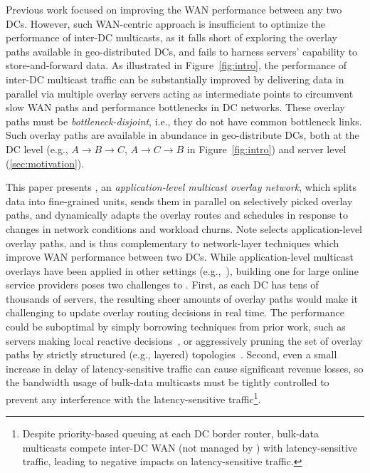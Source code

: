 Previous work focused on improving the WAN performance between any 
two DCs. 
However, such WAN-centric approach is insufficient to optimize the 
performance of inter-DC multicasts, as it falls short of exploring 
the overlay paths available in geo-distributed DCs, and 
fails to harness servers' capability to store-and-forward data.
As illustrated in Figure~\ref{fig:intro}, the performance of 
inter-DC multicast traffic can be substantially improved by 
delivering data in parallel via multiple overlay  servers 
acting as intermediate points to circumvent slow WAN paths and 
performance bottlenecks in DC networks. 
These overlay paths must be {\em bottleneck-disjoint}, i.e., they do 
not have common bottleneck links. 
Such overlay paths are available in abundance in 
geo-distribute DCs, both at the 
DC level (e.g., $A$$\rightarrow$$B$$\rightarrow$$C$, 
$A$$\rightarrow$$C$$\rightarrow$$B$ in Figure~\ref{fig:intro}) 
and server level (\Section\ref{sec:motivation}).




This paper presents {\em \name}, an {\em application-level 
multicast overlay network}, which 
\name splits data into fine-grained 
units, sends them in parallel on selectively picked 
overlay paths, and dynamically adapts the overlay routes and 
schedules in response to changes in network conditions and 
workload churns.
Note \name selects application-level overlay paths, and is thus
complementary to network-layer techniques which
improve WAN performance between two DCs.
While application-level multicast overlays have been applied 
in other settings
(e.g.,~\cite{Liebeherr2002Application,Wang2007mTreebone,
Andreev2013Designing,Mokhtarian2015Minimum}), building one
for large online service providers poses two 
challenges to \name.
First, as each DC has tens of thousands of servers, the 
resulting sheer amounts of overlay paths would make it 
challenging to update overlay routing decisions in real time. 
The performance could be suboptimal by simply borrowing techniques 
from prior work, such as servers making local reactive
decisions~\cite{kostic2003bullet,Repantis2010Scaling,VdnAtSIGCOMM2014},
or aggressively pruning the set of overlay paths by strictly 
structured (e.g., layered) topologies~\cite{Nygren2010The}.
Second, even a small increase in delay of latency-sensitive traffic 
can cause significant revenue losses, so the bandwidth usage 
of bulk-data multicasts must be tightly controlled 
to prevent any interference with the latency-sensitive 
traffic\footnote{Despite priority-based queuing 
at each DC border router, bulk-data multicasts compete
inter-DC WAN (not managed by \company) with
latency-sensitive traffic, leading to negative impacts on 
latency-sensitive traffic.}.

